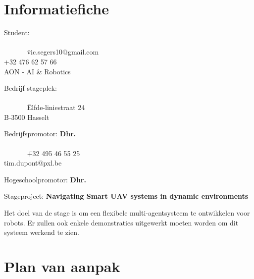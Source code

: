 \documentclass[a4paper]{article}
\begin{document}
  \section{Informatiefiche}
    \begin{tabbing}
      Student: \textbf{\student}\\
      \\
      ~~~~~~ \= vic.segers10@gmail.com\\
      \> +32 476 62 57 66\\
      \> AON - AI \& Robotics
    \end{tabbing}
    \begin{tabbing}
      Bedrijf stageplek: \textbf{\stagebedrijf}\\
      \\
      ~~~~~~ \= Elfde-liniestraat 24\\
      \> B-3500 Hasselt
    \end{tabbing}
    \begin{tabbing}
      Bedrijfspromotor: \textbf{Dhr. \bedrijfspromotor}\\
      \\
      ~~~~~~ \= +32 495 46 55 25\\
      \> tim.dupont@pxl.be
    \end{tabbing}
    \begin{tabbing}
      Hogeschoolpromotor: \textbf{Dhr. \pxlpromotor}
    \end{tabbing}
    Stageproject: \textbf{Navigating Smart UAV systems in dynamic environments}
    \begin{addmargin}[5ex]{0pt}
      Het doel van de stage is om een flexibele multi-agentsysteem te ontwikkelen voor robots. Er zullen ook enkele demonstraties uitgewerkt moeten worden om dit systeem werkend te zien.
    \end{addmargin}
  \section{Plan van aanpak}
\end{document}
